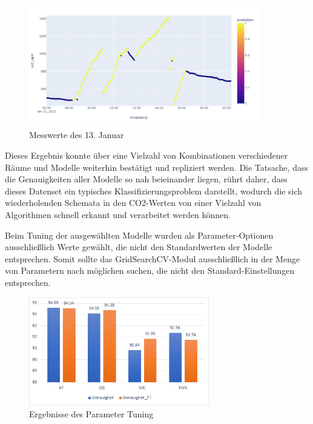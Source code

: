 \begin{figure}[h]
    \centering
    \includegraphics[width=0.9\textwidth]{pic/nov23_predicted.png}
    \caption{Messwerte des 13. Januar}
    \label{fig:ConMatrix}
\end{figure}

Dieses Ergebnis konnte über eine Vielzahl von Kombinationen verschiedener Räume und Modelle weiterhin
bestätigt und repliziert werden. Die Tatsache, dass die Genauigkeiten aller Modelle so nah beieinander 
liegen, rührt daher, dass dieses Datenset ein typisches Klassifizierungsproblem darstellt,
wodurch die sich wiederholenden Schemata in den CO2-Werten von einer Vielzahl von Algorithmen schnell 
erkannt und verarbeitet werden können.

Beim Tuning der ausgewählten Modelle wurden als Parameter-Optionen ausschließlich Werte gewählt, die nicht 
den Standardwerten der Modelle entsprechen. Somit sollte das GridSearchCV-Modul ausschließlich in der Menge 
von Parametern nach möglichen suchen, die nicht den Standard-Einstellungen entsprechen.

\begin{figure}[h]
    \centering
    \includegraphics[width=0.7\textwidth]{pic/param_eval.png}
    \caption{Ergebnisse des Parameter Tuning}
    \label{fig:PT_eval}
\end{figure}

